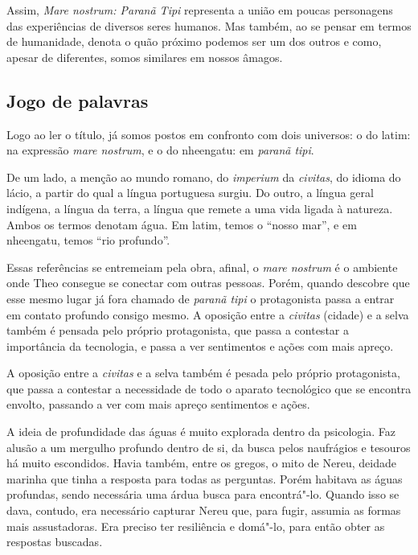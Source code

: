 \documentclass[12pt]{extarticle}
\begin{document}
Assim, \emph{Mare nostrum: Paranã Tipi} representa a união em poucas
personagens das experiências de diversos seres humanos. Mas também, ao
se pensar em termos de humanidade, denota o quão próximo podemos ser um
dos outros e como, apesar de diferentes, somos similares em nossos
âmagos.

\subsection{Jogo de palavras}

Logo ao ler o título, já somos postos em confronto com dois universos: o do
latim: na expressão  \emph{mare nostrum}, e o do nheengatu: em  \emph{paranã tipi}.

De um lado, a menção ao mundo romano, do \emph{imperium} da \emph{civitas}, do idioma do
lácio, a partir do qual a língua portuguesa surgiu.
Do outro, a língua geral indígena, a língua da terra, a língua que remete a
uma vida ligada à natureza. Ambos os termos denotam água. Em latim, temos 
o ``nosso mar'', e em nheengatu, temos ``rio profundo''.

Essas referências se entremeiam pela obra, afinal, o \emph{mare nostrum} é o
ambiente onde Theo consegue se conectar com outras pessoas.
Porém, quando descobre que esse mesmo lugar já fora chamado de \emph{paranã tipi}  o
protagonista passa a entrar em contato profundo consigo mesmo.
A oposição entre a \textit{civitas} (cidade) e a selva também é pensada pelo próprio
protagonista, que passa a contestar a importância da tecnologia, e passa a
ver sentimentos e ações com mais apreço.



A oposição entre a \emph{civitas} e a selva também é pesada pelo próprio
protagonista, que passa a contestar a necessidade de todo o aparato
tecnológico que se encontra envolto, passando a ver com mais apreço
sentimentos e ações.

A ideia de profundidade das águas é muito explorada dentro da
psicologia. Faz alusão a um mergulho profundo dentro de si, da busca
pelos naufrágios e tesouros há muito escondidos. Havia também, entre os
gregos, o mito de Nereu, deidade marinha que tinha a resposta para todas
as perguntas. Porém habitava as águas profundas, sendo necessária uma
árdua busca para encontrá"-lo. Quando isso se dava, contudo, era
necessário capturar Nereu que, para fugir, assumia as formas mais
assustadoras. Era preciso ter resiliência e domá"-lo, para então obter as
respostas buscadas.
\end{document}
